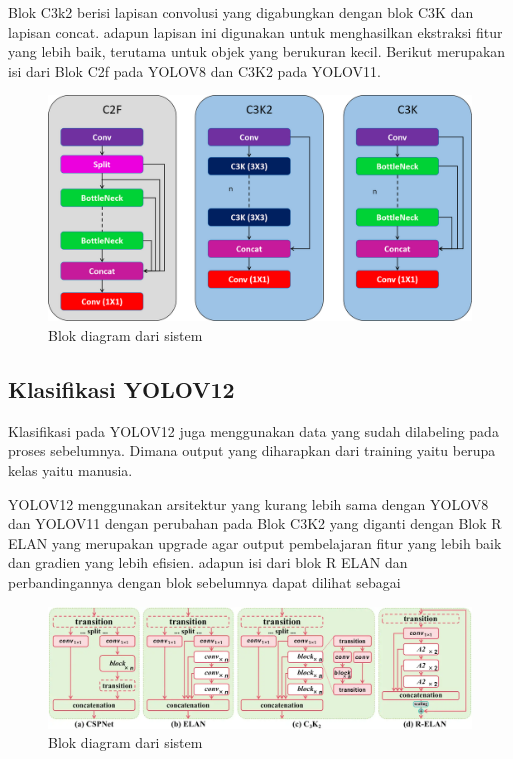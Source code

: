 Blok C3k2 berisi lapisan convolusi yang digabungkan dengan blok C3K dan lapisan concat. adapun lapisan ini digunakan untuk menghasilkan ekstraksi fitur yang lebih baik, terutama untuk objek yang berukuran kecil. Berikut merupakan isi dari Blok C2f pada YOLOV8 dan C3K2 pada YOLOV11.

\begin{figure} [H] \centering
  \includegraphics[scale=0.18]{gambar/c2f c3k2.png}
  \caption{Blok diagram dari sistem}
  \label{fig:rancangan penelitian}
\end{figure}


\subsection{Klasifikasi YOLOV12}
Klasifikasi pada YOLOV12 juga menggunakan data yang sudah dilabeling pada proses sebelumnya. Dimana output yang diharapkan dari training yaitu berupa kelas yaitu manusia.

YOLOV12 menggunakan arsitektur yang kurang lebih sama dengan YOLOV8 dan YOLOV11 dengan perubahan pada Blok C3K2  yang diganti dengan Blok R ELAN yang merupakan upgrade agar output pembelajaran fitur yang lebih baik dan gradien yang lebih efisien. adapun isi dari blok R ELAN dan perbandingannya dengan blok sebelumnya dapat dilihat sebagai  

\begin{figure} [H] \centering
  \includegraphics[scale=0.18]{gambar/r elan.png}
  \caption{Blok diagram dari sistem}
  \label{fig:rancangan penelitian}
\end{figure}

